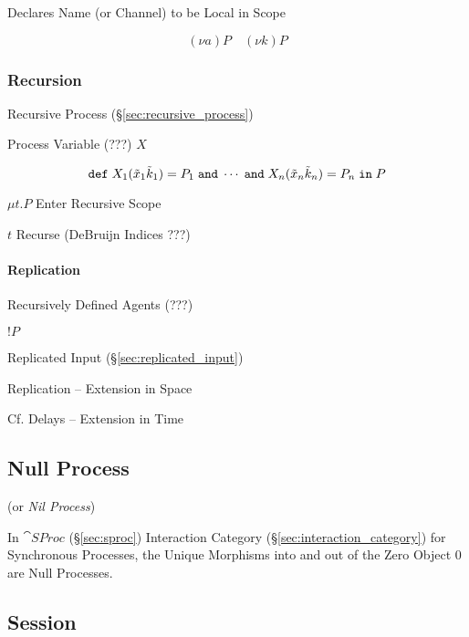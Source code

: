 Declares Name (or Channel) to be Local in Scope

\[
  (\nu a)P \quad (\nu k)P
\]



\subsubsection{Recursion}\label{sec:process_recursion}

Recursive Process (\S\ref{sec:recursive_process})

Process Variable (???) $X$

\[
  \mathtt{def} \; X_1(\tilde{x}_1 \tilde{k}_1)
  = P_1 \; \mathtt{and} \; \cdots \; \mathtt{and} \;
  X_n(\tilde{x}_n \tilde{k}_n) = P_n \; \mathtt{in} \; P
\]

$\mu t.P$ Enter Recursive Scope

$t$ Recurse (DeBruijn Indices ???) %



\paragraph{Replication}\label{sec:replication}\hfill

Recursively Defined Agents (???)

$!P$

Replicated Input (\S\ref{sec:replicated_input})

Replication -- Extension in Space

\fist Cf. Delays -- Extension in Time \cite{abramsky-gay-nagarajan96}



\subsection{Null Process}\label{sec:null_process}

(or \emph{Nil Process})

In $\cat{SProc}$ (\S\ref{sec:sproc}) Interaction Category
(\S\ref{sec:interaction_category}) for Synchronous Processes, the
Unique Morphisms into and out of the Zero Object $0$ are Null
Processes.



\subsection{Session}\label{sec:session}

